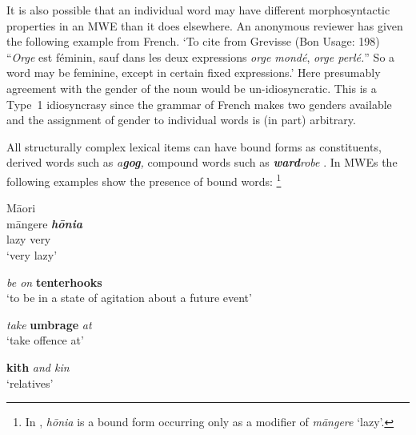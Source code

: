 \documentclass[output=paper]{langsci/langscibook}
\begin{document}
It is also possible that an individual word may have different  morphosyntactic properties in an MWE than it does elsewhere.  An anonymous reviewer has given the following example from French. ‘To cite from Grevisse (Bon Usage: 198) “\textit{Orge} est féminin, sauf dans les deux expressions \textit{orge mondé}, \textit{orge perlé.}” So a word may be feminine, except in certain fixed expressions.’ Here presumably agreement with the gender of the noun would be un-idiosyncratic. This is a Type~1 idiosyncrasy since the grammar of French  makes two genders available and the assignment of gender to individual words is (in part) arbitrary.

All structurally complex lexical items can have bound forms as constituents, derived words such as \textit{a}\textbf{\textit{gog}}\textit{,}  compound words such as \textbf{\textit{ward}}\textit{robe} \citep{Richter2010}. In MWEs the following examples show the presence of bound words:%
\footnote{In , \textit{h\=onia} is a bound form occurring only as a modifier of \textit{m\=angere} ‘lazy’.}  

\begin{exe}
\ex\label{ex:ex18}    M\=aori\\ 
\gll m\=angere \textbf{\textit{h\=onia}} \\
                      lazy     very\\
                      \glt `very lazy'



\ex\label{ex:ex19}  \textit{be on} \textbf{tenterhooks}\\
  ‘to be in a state of agitation about a future event’


\ex\label{ex:ex20}  \textit{take} \textbf{umbrage} \textit{at}\\
 ‘take offence at’

\ex\label{ex:ex21}    \textbf{kith} \textit{and kin}\\
  ‘relatives’
\end{exe}
\end{document}
